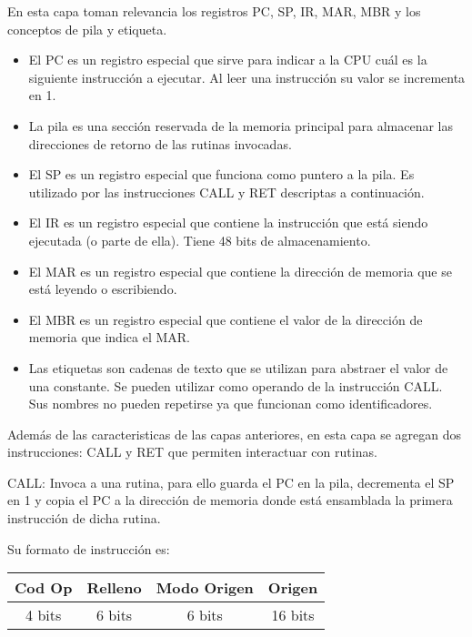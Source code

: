 \begin{threeparttable}
\begin{threeparttable}
En esta capa toman relevancia los registros PC, SP, IR, MAR, MBR y los conceptos de pila y etiqueta.
\begin{itemize}
  \item El PC es un registro especial que sirve para indicar a la CPU cuál es la siguiente instrucción a ejecutar. 
  Al leer una instrucción su valor se incrementa en 1.
  \item La pila es una sección reservada de la memoria principal para almacenar las direcciones de retorno de las rutinas invocadas.
  \item El SP es un registro especial que funciona como puntero a la pila. Es utilizado por las instrucciones CALL y RET descriptas a continuación.
  \item El IR es un registro especial que contiene la instrucción que está siendo ejecutada (o parte de ella). Tiene 48 bits de almacenamiento.
  \item El MAR es un registro especial que contiene la dirección de memoria que se está leyendo o escribiendo.
  \item El MBR es un registro especial que contiene el valor de la dirección de memoria que indica el MAR.
  \item Las etiquetas son cadenas de texto que se utilizan para abstraer el valor de una constante. Se pueden utilizar como operando de la
  instrucción CALL. Sus nombres no pueden repetirse ya que funcionan como identificadores.
\end{itemize}

Además de las caracteristicas de las capas anteriores, en esta capa se agregan dos instrucciones: CALL y RET que permiten interactuar con rutinas.

CALL: Invoca a una rutina, para ello guarda el PC en la pila, decrementa el SP en 1 y copia el PC a la dirección de memoria donde está ensamblada la primera instrucción de dicha rutina. 

Su formato de instrucción es:
\begin{table}[H]
  \label{tab:formatoinstruccion}
  \begin{center}
    \begin{tabular}{| c | c | c | c |}
      \hline
      \textbf{Cod Op} & \textbf{Relleno} & \textbf{Modo Origen} & \textbf{Origen} \\ \hline
      4 bits          & 6 bits                & 6 bits          & 16 bits         \\ \hline
    \end{tabular}
  \end{center}
\end{table}


\end{threeparttable}
\end{threeparttable}
